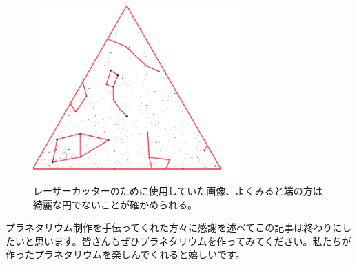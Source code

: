 \documentclass[supernova_2023]{subfiles}
\begin{document}
\begin{figure}[H]
  \centering
  \includegraphics[width=8cm]{figures/Nakahara/fig3.png}
  \caption{\footnotesize レーザーカッターのために使用していた画像、よくみると端の方は綺麗な円でないことが確かめられる。}
  \label{fig:3}
\end{figure}

プラネタリウム制作を手伝ってくれた方々に感謝を述べてこの記事は終わりにしたいと思います。皆さんもぜひプラネタリウムを作ってみてください。私たちが作ったプラネタリウムを楽しんでくれると嬉しいです。
\end{document}
